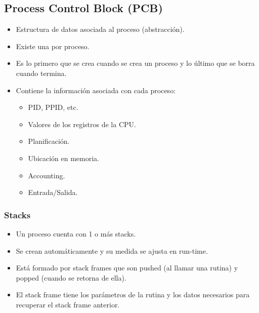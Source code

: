 \subsection{Process Control Block (PCB)}
\begin{itemize}
    \item Estructura de datos asociada al proceso (abstracción).
    \item Existe una por proceso.
    \item Es lo primero que se crea cuando se crea un proceso y lo último que se borra cuando termina.
    \item Contiene la información asociada con cada proceso:
        \begin{itemize}
            \item PID, PPID, etc.
            \item Valores de los registros de la CPU.
            \item Planificación.
            \item Ubicación en memoria.
            \item Accounting.
            \item Entrada/Salida.
        \end{itemize}
\end{itemize}

\subsubsection{Stacks}
\begin{itemize}
    \item Un proceso cuenta con 1 o más stacks.
    \item Se crean automáticamente y su medida se ajusta en run-time.
    \item Está formado por stack frames que son pushed (al llamar una rutina) y popped (cuando se retorna de ella).
    \item El stack frame tiene los parámetros de la rutina y los datos necesarios para recuperar el stack frame anterior.
\end{itemize}


